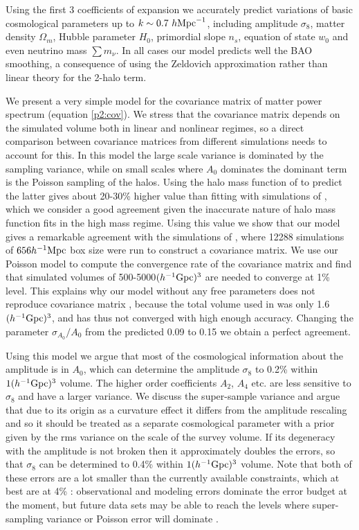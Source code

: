 \documentclass[
  11pt,
  twoside,
  openright,
  titlepage,
  headings=optiontoheadandtoc
]{scrbook}
\begin{document}
Using the first 3 coefficients of expansion 
we accurately predict variations of basic cosmological parameters up to $k\sim 0.7\ h \rm{Mpc}^{-1}$, including amplitude 
$\sigma_8$, matter density $\Omega_m$, Hubble parameter $H_0$, primordial slope $n_s$, 
equation of state $w_0$ and even neutrino mass $\sum m_{\nu}$. In all cases our model predicts well the BAO 
smoothing, a consequence of using the 
Zeldovich approximation rather than linear theory for the 2-halo term. 

We present a very simple 
model for the covariance matrix of matter power spectrum (equation \ref{p2:cov}). 
We stress that the covariance matrix depends on the simulated volume both in linear and 
nonlinear regimes, so a direct comparison between covariance matrices from 
different simulations needs to account for this. 
In this model the large scale variance is dominated by the 
sampling variance, while 
on small scales where $A_0$ dominates the dominant term is the Poisson sampling of the halos. 
Using the halo mass function  of \cite{2008ApJ...688..709T} to predict the latter gives about 20-30\% higher value than 
fitting with simulations of \cite{2014PhRvD..89h3519L}, which we consider a good agreement given the 
inaccurate nature of halo mass function fits in the high mass regime.
Using this value we 
show that our model gives a remarkable agreement with 
the simulations of \cite{2014arXiv1406.2713B}, where 12288 simulations of $656 h^{-1}{\rm Mpc}$ box size were run to 
construct a covariance matrix. 
We use our Poisson model to compute the convergence rate of the covariance matrix and find that simulated 
volumes of 500-5000$(h^{-1}{\rm Gpc})^3$ are needed to converge at 1\% level. This explains why our model without any free parameters 
does not reproduce covariance matrix 
\cite{2012MNRAS.423.2288H}, because the total volume used in \cite{2012MNRAS.423.2288H} 
was only 1.6$(h^{-1}{\rm Gpc})^3$, and has thus not converged with high enough accuracy. 
Changing the parameter $\sigma_{A_0}/A_0$ from 
the predicted 0.09 to 0.15 we obtain a perfect agreement. 

Using this model we argue that most of the cosmological information about the amplitude 
is in $A_0$, which can determine the amplitude $\sigma_8$ to 0.2\% within $1(h^{-1}{\rm Gpc})^3$ volume. 
The higher order coefficients $A_2$, $A_4$ etc. 
are less sensitive to $\sigma_8$ and have a larger variance.
We discuss the super-sample variance and argue that due to its origin as a curvature effect it
differs from the amplitude rescaling and so it 
should be treated as a separate cosmological parameter with a 
prior given by the rms variance on the scale of the survey volume. 
If its degeneracy with the amplitude is not broken then it approximately doubles the errors, so that 
$\sigma_8$ can be determined to 0.4\% within $1(h^{-1}{\rm Gpc})^3$  volume. Note that both of these errors are a lot 
smaller than the currently available constraints, which at best are at 
4\% \citep{2013MNRAS.430.2200K}: observational and modeling errors 
dominate the error budget 
at the moment, but future data sets may be able to reach the levels where super-sampling variance 
or Poisson error will dominate \citep{2012PhRvD..86h3504Y}. 
\end{document}
